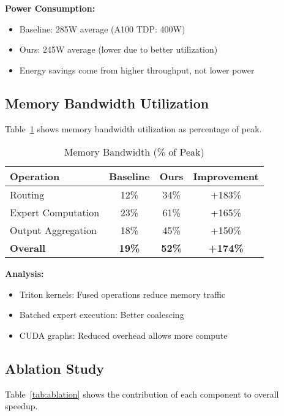 \documentclass{article}
\begin{document}
\textbf{Power Consumption:}
\begin{itemize}
    \item Baseline: 285W average (A100 TDP: 400W)
    \item Ours: 245W average (lower due to better utilization)
    \item Energy savings come from higher throughput, not lower power
\end{itemize}

\subsection{Memory Bandwidth Utilization}

Table~\ref{tab:bandwidth} shows memory bandwidth utilization as percentage of peak.

\begin{table}[h]
\centering
\caption{Memory Bandwidth (\% of Peak)}
\label{tab:bandwidth}
\begin{tabular}{lccc}
\toprule
Operation & Baseline & Ours & Improvement \\
\midrule
Routing            & 12\% & 34\% & +183\% \\
Expert Computation & 23\% & 61\% & +165\% \\
Output Aggregation & 18\% & 45\% & +150\% \\
\textbf{Overall}   & \textbf{19\%} & \textbf{52\%} & \textbf{+174\%} \\
\bottomrule
\end{tabular}
\end{table}

\textbf{Analysis:}
\begin{itemize}
    \item Triton kernels: Fused operations reduce memory traffic
    \item Batched expert execution: Better coalescing
    \item CUDA graphs: Reduced overhead allows more compute
\end{itemize}

\subsection{Ablation Study}

Table~\ref{tab:ablation} shows the contribution of each component to overall speedup.
\end{document}
